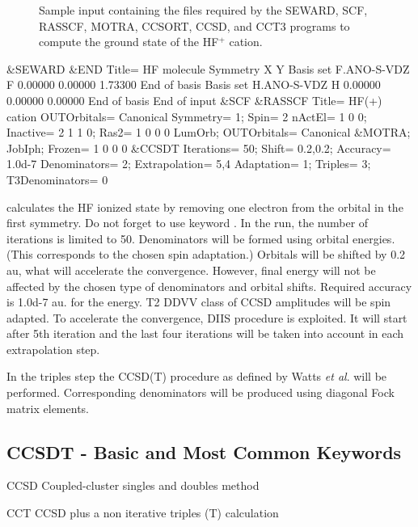 
\begin{figure}[h]
\caption{Sample input containing the files required by the SEWARD, SCF,
RASSCF, MOTRA, CCSORT, CCSD, and
CCT3 programs to compute the ground state of the HF$^+$ cation.}
\label{fig:ccsdt_input}
\end{figure}
\begin{inputlisting}
 &SEWARD &END
Title= HF molecule
Symmetry
X Y
Basis set
F.ANO-S-VDZ
F      0.00000   0.00000   1.73300
End of basis
Basis set
H.ANO-S-VDZ
H      0.00000   0.00000   0.00000
End of basis
End of input
 &SCF
 &RASSCF 
Title= HF(+) cation
OUTOrbitals= Canonical
Symmetry= 1; Spin= 2
nActEl= 1 0 0; Inactive= 2 1 1 0; Ras2= 1 0 0 0
LumOrb; OUTOrbitals= Canonical
 &MOTRA; JobIph; Frozen= 1 0 0 0
 &CCSDT 
Iterations= 50; Shift= 0.2,0.2; Accuracy= 1.0d-7
Denominators= 2; Extrapolation= 5,4
Adaptation= 1; Triples= 3; T3Denominators= 0
\end{inputlisting}

 calculates the HF ionized state by removing one electron
from the orbital in the first symmetry.
Do not forget to use keyword
.
In the  run, the number of iterations is limited to 50.
Denominators will be formed using orbital energies. (This corresponds to the
chosen spin adaptation.) Orbitals will be shifted by 0.2 au,
what will accelerate the convergence. However, final energy will not be
affected by the chosen type of denominators and orbital shifts. Required
accuracy is 1.0d-7 au. for the energy. T2 DDVV class of CCSD amplitudes will
be spin adapted.
To accelerate the convergence,
DIIS procedure is exploited. It will start after 5th iteration and
the last four iterations will be taken into account in each extrapolation step.

In the triples step the CCSD(T) procedure as defined
by Watts {\em et al}. \cite{t3_watts} will be performed.
Corresponding denominators will be produced using diagonal Fock matrix elements.

\subsection{CCSDT - Basic and Most Common Keywords}
\begin{keywordlist}
\item[CCSD] Coupled-cluster singles and doubles method
\item[CCT] CCSD plus a non iterative triples (T) calculation
\item[]

\end{keywordlist} 

